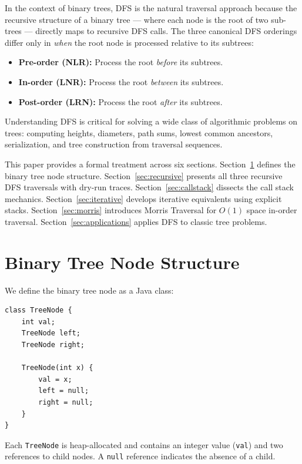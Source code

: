 \documentclass[10pt,journal,compsoc,onecolumn]{IEEEtran}
\begin{document}
In the context of binary trees, DFS is the natural traversal approach because the recursive structure of a binary tree --- where each node is the root of two sub-trees --- directly maps to recursive DFS calls. The three canonical DFS orderings differ only in \emph{when} the root node is processed relative to its subtrees:

\begin{itemize}
    \item \textbf{Pre-order (NLR):} Process the root \emph{before} its subtrees.
    \item \textbf{In-order (LNR):} Process the root \emph{between} its subtrees.
    \item \textbf{Post-order (LRN):} Process the root \emph{after} its subtrees.
\end{itemize}

Understanding DFS is critical for solving a wide class of algorithmic problems on trees: computing heights, diameters, path sums, lowest common ancestors, serialization, and tree construction from traversal sequences.

This paper provides a formal treatment across six sections. Section~\ref{sec:node} defines the binary tree node structure. Section~\ref{sec:recursive} presents all three recursive DFS traversals with dry-run traces. Section~\ref{sec:callstack} dissects the call stack mechanics. Section~\ref{sec:iterative} develops iterative equivalents using explicit stacks. Section~\ref{sec:morris} introduces Morris Traversal for $O(1)$ space in-order traversal. Section~\ref{sec:applications} applies DFS to classic tree problems.

\section{Binary Tree Node Structure}
\label{sec:node}

We define the binary tree node as a Java class:

\begin{verbatim}
class TreeNode {
    int val;
    TreeNode left;
    TreeNode right;

    TreeNode(int x) {
        val = x;
        left = null;
        right = null;
    }
}
\end{verbatim}

Each \texttt{TreeNode} is heap-allocated and contains an integer value (\texttt{val}) and two references to child nodes. A \texttt{null} reference indicates the absence of a child.
\end{document}
